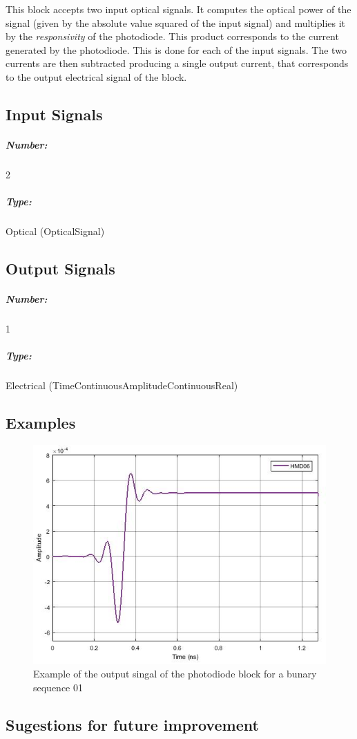 \documentclass[a4paper]{article}
\begin{document}
This block accepts two input optical signals. It computes the optical power of the signal (given by the absolute value squared of the input signal) and multiplies it by the \textit{responsivity} of the photodiode. This product corresponds to the current generated by the photodiode. This is done for each of the input signals. The two currents are then subtracted producing a single output current, that corresponds to the output electrical signal of the block.

\pagebreak

\subsection*{Input Signals}

\subparagraph*{Number:} 2

\subparagraph*{Type:} Optical (OpticalSignal)

\subsection*{Output Signals}

\subparagraph*{Number:} 1

\subparagraph*{Type:} Electrical (TimeContinuousAmplitudeContinuousReal)

\subsection*{Examples} 

\begin{figure}[h]
	\centering
	\includegraphics[width=\textwidth]{Photodiode_output}
	\caption{Example of the output singal of the photodiode block for a bunary sequence 01}\label{Photodiode_output}
\end{figure}

\subsection*{Sugestions for future improvement}
\end{document}
